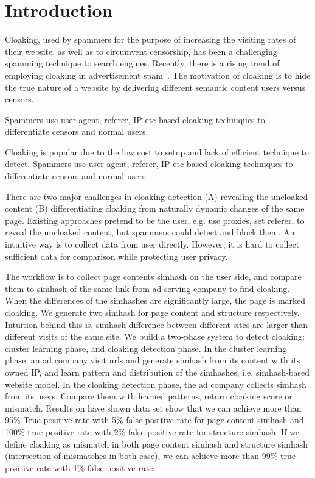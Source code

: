 \section{Introduction}
\label{s:intro}

Cloaking, used by spammers for the purpose of increasing the visiting rates of
their website, as well as to circumvent censorship, has been a challenging
spamming technique to search engines. Recently, there is a rising trend of
employing cloaking in advertisement spam~\cite{li2012knowing}.  The motivation
of cloaking is to hide the true nature of a website by delivering different
semantic content users versus censors.

Spammers use user agent, referer, IP etc based cloaking techniques to
differentiate censors and normal users.

Cloaking is popular due to the low cost to setup and lack of efficient technique
to detect. Spammers use user agent, referer, IP etc based cloaking techniques to
differentiate censors and normal users.

There are two major challenges in cloaking detection (A) revealing the uncloaked
content (B) differentiating cloaking from naturally dynamic changes of the same
page. Existing approaches pretend to be the user, e.g. use proxies, set referer,
to reveal the uncloaked content, but spammers could detect and block them. An
intuitive way is to collect data from user directly. However, it is hard to
collect sufficient data for comparison while protecting user privacy.


The workflow is to collect page contents simhash on the user side, and compare
them to simhash of the same link from ad serving company to find cloaking. When
the differences of the simhashes are significantly large, the page is marked
cloaking. We generate two simhash for page content and structure respectively.
Intuition behind this is, simhash difference between different sites are larger
than different visits of the same site. We build a two-phase system to detect
cloaking: cluster learning phase, and cloaking detection phase. In the cluster
learning phase, an ad company visit urls and generate simhash from its content
with its owned IP, and learn pattern and distribution of the simhashes, i.e.
simhash-based website model. In the cloaking detection phase, the ad company
collects simhash from its users. Compare them with learned patterns, return
cloaking score or mismatch. Results on have shown data set show that we can
achieve more than 95\% True positive rate with 5\% false positive rate for page
content simhash and 100\% true positive rate with 2\% false positive rate for
structure simhash. If we define cloaking as mismatch in both page content
simhash and structure simhash (intersection of mismatches in both case), we can
achieve more than 99\% true positive rate with 1\% false positive rate.


